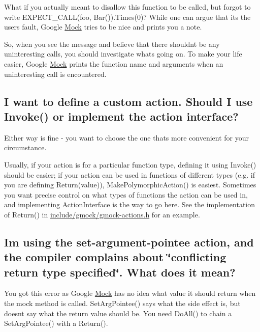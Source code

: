 What if you actually meant to disallow this function to be called, but forgot to write {\ttfamily E\+X\+P\+E\+C\+T\+\_\+\+C\+A\+L\+L(foo, Bar()).Times(0)}? While one can argue that it\textquotesingle{}s the user\textquotesingle{}s fault, Google \mbox{\hyperlink{class_mock}{Mock}} tries to be nice and prints you a note.

So, when you see the message and believe that there shouldn\textquotesingle{}t be any uninteresting calls, you should investigate what\textquotesingle{}s going on. To make your life easier, Google \mbox{\hyperlink{class_mock}{Mock}} prints the function name and arguments when an uninteresting call is encountered.

\subsection*{I want to define a custom action. Should I use Invoke() or implement the action interface?}

Either way is fine -\/ you want to choose the one that\textquotesingle{}s more convenient for your circumstance.

Usually, if your action is for a particular function type, defining it using {\ttfamily Invoke()} should be easier; if your action can be used in functions of different types (e.\+g. if you are defining {\ttfamily Return(value)}), {\ttfamily Make\+Polymorphic\+Action()} is easiest. Sometimes you want precise control on what types of functions the action can be used in, and implementing {\ttfamily Action\+Interface} is the way to go here. See the implementation of {\ttfamily Return()} in {\ttfamily \mbox{\hyperlink{gmock-actions_8h_source}{include/gmock/gmock-\/actions.\+h}}} for an example.

\subsection*{I\textquotesingle{}m using the set-\/argument-\/pointee action, and the compiler complains about \char`\"{}conflicting return type specified\char`\"{}. What does it mean?}

You got this error as Google \mbox{\hyperlink{class_mock}{Mock}} has no idea what value it should return when the mock method is called. {\ttfamily Set\+Arg\+Pointee()} says what the side effect is, but doesn\textquotesingle{}t say what the return value should be. You need {\ttfamily Do\+All()} to chain a {\ttfamily Set\+Arg\+Pointee()} with a {\ttfamily Return()}.


